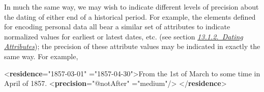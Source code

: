 In much the same way, we may wish to indicate different levels of precision about the dating of either end of a historical period. For example, the elements defined for encoding personal data all bear a similar set of attributes to indicate normalized values for earliest or latest dates, etc. (see section \textit{\hyperref[NDATTSda]{13.1.2.\ Dating Attributes}}); the precision of these attribute values may be indicated in exactly the same way. For example, \par\bgroup{}\exampleFont \begin{shaded}\noindent\mbox{}{<\textbf{residence}\hspace*{1em}{from}="{1857-03-01}"\mbox{}\newline 
\hspace*{1em}{notAfter}="{1857-04-30}">}From the 1st of March to\mbox{}\newline 
 some time in April of 1857.\mbox{}\newline 
{<\textbf{precision}\hspace*{1em}{match}="{@notAfter}"\mbox{}\newline 
\hspace*{1em}\hspace*{1em}{precision}="{medium}"/>}\mbox{}\newline 
{</\textbf{residence}>}\end{shaded}\egroup\par \par
